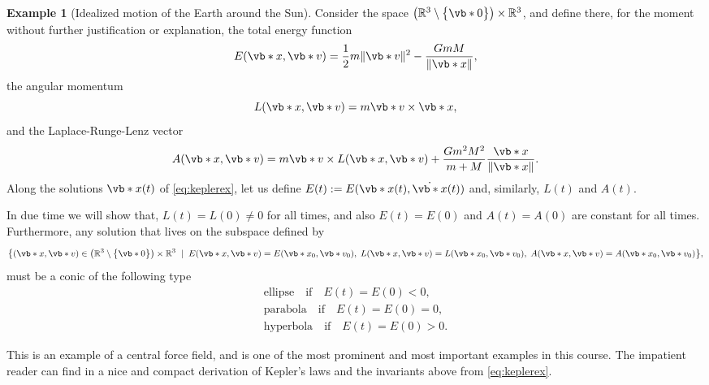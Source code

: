 \documentclass[english,fontsize=11pt,paper=b5]{scrbook}
\numberwithin{equation}{chapter}
\theoremstyle{definition}
\newtheorem{example}{Example}[chapter]
\begin{document}
\begin{example}[Idealized motion of the Earth around the Sun]
    Consider the space $\big(\mathbb{R}^3\setminus\big\{\vb*{0}\big\}\big)\times\mathbb{R}^3$, and define there, for the moment without further justification or explanation, the total energy function
    \begin{equation}\label{eq:energyKepler}
      E(\vb*{x},\vb*{v}) = \frac{1}{2}m\|\vb*{v}\|^2 - \frac{GmM}{\|\vb*{x}\|},
    \end{equation}
    the angular momentum
    \begin{equation}
      L(\vb*{x},\vb*{v}) = m \vb*{v} \times \vb*{x},
    \end{equation}
    and the Laplace-Runge-Lenz vector
    \begin{equation}
      A(\vb*{x},\vb*{v}) = m \vb*{v} \times L(\vb*{x}, \vb*{v}) + \frac{G m^2 M^2}{m+M} \frac{\vb*{x}}{\|\vb*{x}\|}.
    \end{equation}
    Along the solutions $\vb*{x}(t)$ of \eqref{eq:keplerex}, let us define $E(t) := E(\vb*{x}(t),\dot{\vb*{x}}(t))$ and, similarly, $L(t)$ and $A(t)$.

    In due time we will show that, $L(t) = L(0) \neq 0$ for all times, and also $E(t) = E(0)$ and $A(t) = A(0)$ are constant for all times.
    Furthermore, any solution that lives on the subspace defined by
    \begin{align}
        \big\{
       (\vb*{x}, \vb*{v})\in \big(\mathbb{R}^3\setminus\big\{\vb*{0}\big\}\big)\times\mathbb{R}^3 \;\mid\;
       E(\vb*{x},\vb*{v}) = E(\vb*{x}_0, \vb*{v}_0),\;
       L(\vb*{x},\vb*{v}) = L(\vb*{x}_0, \vb*{v}_0),\;
       A(\vb*{x},\vb*{v}) = A(\vb*{x}_0, \vb*{v}_0)
     \big\},
    \end{align}
    must be a conic of the following type
    \begin{equation}
      \begin{split}
        \mbox{ellipse} \quad \mbox{if} \quad E(t) = E(0) < 0, \\
        \mbox{parabola} \quad \mbox{if} \quad E(t) = E(0) = 0, \\
        \mbox{hyperbola} \quad \mbox{if} \quad E(t) = E(0) > 0.
      \end{split}
    \end{equation}

    This is an example of a central force field, and is one of the most prominent and most important examples in this course.
    The impatient reader can find in \cite[Ch. 1]{book:knauf} a nice and compact derivation of Kepler's laws and the invariants above from \eqref{eq:keplerex}.
  \end{example}
\end{document}
